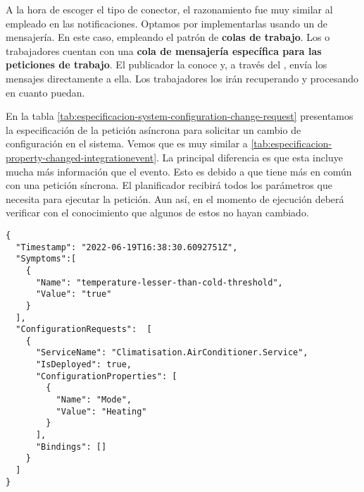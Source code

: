 A la hora de escoger el tipo de conector, el razonamiento fue muy similar al empleado en las notificaciones. Optamos por implementarlas usando un  de mensajería. En este caso, empleando el patrón de \textbf{colas de trabajo}. Los \textbf{} o trabajadores cuentan con una \textbf{cola de mensajería específica para las peticiones de trabajo}. El publicador la conoce y, a través del , envía los mensajes directamente a ella. Los trabajadores los irán recuperando y procesando en cuanto puedan.

En la tabla \ref{tab:especificacion-system-configuration-change-request} presentamos la especificación de la petición asíncrona para solicitar un cambio de configuración en el sistema. Vemos que es muy similar a \ref{tab:especificacion-property-changed-integrationevent}. La principal diferencia es que esta incluye mucha más información que el evento. Esto es debido a que tiene más en común con una petición síncrona. El planificador recibirá todos los parámetros que necesita para ejecutar la petición. Aun así, en el momento de ejecución deberá verificar con el conocimiento que algunos de estos no hayan cambiado.

\newsavebox\systemconfigurationchangerequestbox
\begin{lrbox}{\systemconfigurationchangerequestbox}
  \begin{minipage}[t]{2in}
    \begin{verbatim}
{
  "Timestamp": "2022-06-19T16:38:30.6092751Z",
  "Symptoms":[
    {
      "Name": "temperature-lesser-than-cold-threshold",
      "Value": "true"
    }
  ],
  "ConfigurationRequests":  [
    {
      "ServiceName": "Climatisation.AirConditioner.Service",
      "IsDeployed": true,
      "ConfigurationProperties": [
        {
          "Name": "Mode",
          "Value": "Heating"
        }
      ],
      "Bindings": []
    }
  ]
}
        \end{verbatim}
  \end{minipage}
\end{lrbox}

